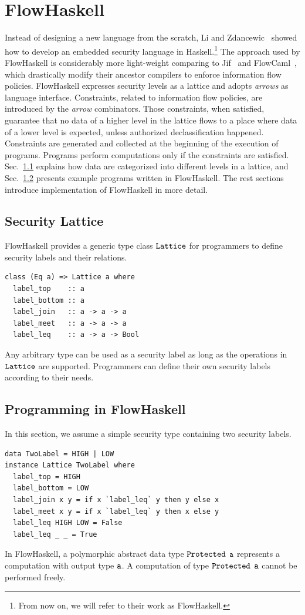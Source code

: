 \documentclass[a4paper]{report}
\newcommand{\co}[1]{$\cod{#1}$}
\begin{document}
\section{FlowHaskell}
Instead of designing a new language from the scratch, Li and 
Zdancewic~\cite{Li:Zdancewic:CSFW} showed how to develop an embedded security language 
in Haskell.\footnote{From now on, we will refer to their work as FlowHaskell.} 
The approach used by FlowHaskell is considerably more light-weight 
comparing to Jif~\cite{jif} and FlowCaml~\cite{FlowCaml}, which drastically modify their ancestor 
compilers to enforce information flow policies. 
FlowHaskell expresses security levels as a lattice and adopts {\em arrows} as language interface. 
Constraints, related to information flow policies, are introduced by the {\em arrow} combinators. 
Those constraints, when satisfied, guarantee that no data of a higher level in the lattice flows 
to a place where data of a lower level is expected, unless authorized declassification happened.
Constraints are generated and collected at the beginning of the execution of programs. 
Programs perform computations only if the constraints are satisfied.
Sec.~\ref{chap3:lattice} explains how data are categorized into different levels in a lattice, and
Sec.~\ref{chap3:programmingFlowHaskell} presents example programs written in FlowHaskell.
The rest sections introduce implementation of FlowHaskell in more detail.

\subsection{Security Lattice}
\label{chap3:lattice}
FlowHaskell provides a generic type class $\mathtt{Lattice}$ for programmers to define security
labels and their relations. 
\begin{Verbatim}[fontsize=\footnotesize]
class (Eq a) => Lattice a where
  label_top    :: a
  label_bottom :: a
  label_join   :: a -> a -> a
  label_meet   :: a -> a -> a
  label_leq    :: a -> a -> Bool
\end{Verbatim}
Any arbitrary type can be used as a security label as long as the operations in $\mathtt{Lattice}$ are
supported. Programmers can define their own security labels according to their needs.

\subsection{Programming in FlowHaskell}
\label{chap3:programmingFlowHaskell}
In this section, we assume a simple security type containing two security labels. 
\begin{Verbatim}[fontsize=\footnotesize]
data TwoLabel = HIGH | LOW
instance Lattice TwoLabel where
  label_top = HIGH
  label_bottom = LOW
  label_join x y = if x `label_leq` y then y else x
  label_meet x y = if x `label_leq` y then x else y
  label_leq HIGH LOW = False
  label_leq _ _ = True
\end{Verbatim}
In FlowHaskell, a polymorphic abstract data type \co{Protected} \co{a} represents a
computation with output type \co{a}. A computation of type \co{Protected} \co{a} cannot
be performed freely.
\end{document}
